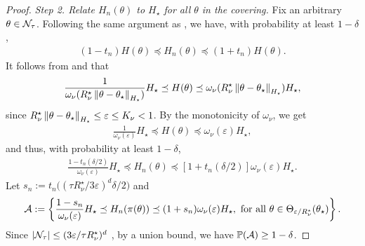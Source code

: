 \begin{proof}
    \emph{Step 2. Relate $H_n(\theta)$ to $H_\star$ for all $\theta$ in the covering.} Fix an arbitrary $\theta \in \mathcal{N}_\tau$. Following the same argument as , we have, with probability at least $1 - \delta$,
    \begin{align}\label{eq:concentration_Hn}
        (1-t_n) H(\theta) \preceq H_n(\theta) \preceq (1+t_n) H(\theta).
    \end{align}
    It follows from  and  that
    \begin{align}\label{eq:pop_hess_bound}
        \frac1{\omega_\nu(R_\nu^\star \left\lVert \theta - \theta_\star \right\rVert_{H_\star})} H_\star \preceq H(\theta) \preceq \omega_\nu(R_\nu^\star \left\lVert \theta - \theta_\star \right\rVert_{H_\star}) H_\star,
    \end{align}
    since $R_\nu^\star \left\lVert \theta - \theta_\star \right\rVert_{H_\star} \le \varepsilon \le K_\nu < 1$.
    By the monotonicity of $\omega_\nu$, we get
    \begin{align*}
        \frac1{\omega_\nu(\varepsilon)} H_\star \preceq H(\theta) \preceq \omega_\nu(\varepsilon) H_\star,
    \end{align*}
    and thus, with probability at least $1 - \delta$,
    \begin{align*}
        \frac{1-t_n(\delta/2)}{\omega_\nu(\varepsilon)} H_\star \preceq H_n(\theta) \preceq [1 + t_n(\delta/2)] \omega_\nu(\varepsilon) H_\star.
    \end{align*}
    Let $s_n := t_n\big( (\tau R_\nu^\star/3\varepsilon)^d \delta/2 \big)$ and
    \begin{align*}
        \mathcal{A} := \left\{ \frac{1-s_n}{\omega_\nu(\varepsilon)} H_\star \preceq H_n(\pi(\theta)) \preceq (1+s_n) \omega_\nu(\varepsilon) H_\star, \mbox{ for all } \theta \in \Theta_{\varepsilon/R_{\nu}^\star}(\theta_\star) \right\}.
    \end{align*}
    Since $\left| \mathcal{N}_\tau \right| \le (3\varepsilon/\tau R_\nu^\star)^d$ \citep{ostrovskii2021finite}, by a union bound, we have $\operatorname{\mathbb P}(\mathcal{A}) \ge 1 - \delta$.
    

\end{proof}
